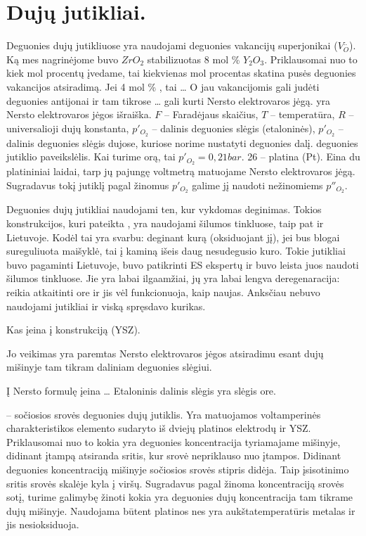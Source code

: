 \section{Dujų jutikliai.}

Deguonies dujų jutikliuose yra naudojami deguonies vakancijų
superjonikai ($V_{O}^{..}$). Ką mes nagrinėjome buvo
$ZrO_{2}$ stabilizuotas 8 mol \% $Y_{2}O_{3}$. Priklausomai nuo
to kiek mol procentų įvedame, tai kiekvienas mol procentas skatina
pusės deguonies vakancijos atsiradimą. Jei 4 mol \% , tai …
O jau vakancijomis gali judėti deguonies antijonai ir tam tikrose
… gali kurti Nersto elektrovaros jėgą.  yra Nersto
elektrovaros jėgos išraiška. $F$ – Faradėjaus skaičius, $T$ – temperatūra,
$R$ – universalioji dujų konstanta, $p'_{O_{2}}$ – dalinis deguonies
slėgis (etaloninės), $p'_{O_{2}}$ – dalinis deguonies slėgis dujose,
kuriose norime nustatyti deguonies dalį.  deguonies jutiklio
paveikslėlis. Kai turime orą, tai $p'_{O_{2}} = 0,21 bar$.
26 – platina (Pt). Eina du platininiai laidai, tarp jų pajungę voltmetrą
matuojame Nersto elektrovaros jėgą. Sugradavus tokį jutiklį pagal žinomus
$p'_{O_{2}}$ galime jį naudoti nežinomiems $p''_{O_2}$.

Deguonies dujų jutikliai naudojami ten, kur vykdomas deginimas. Tokios
konstrukcijos, kuri pateikta , yra naudojami šilumos
tinkluose, taip pat ir Lietuvoje. Kodėl tai yra svarbu: deginant kurą
(oksiduojant jį), jei bus blogai sureguliuota maišyklė, tai į kaminą
išeis daug nesudegusio kuro. Tokie jutikliai buvo pagaminti Lietuvoje,
buvo patikrinti ES ekspertų ir buvo leista juos naudoti šilumos tinkluose.
Jie yra labai ilgaamžiai, jų yra labai lengva deregenaracija: reikia
atkaitinti ore ir jis vėl funkcionuoja, kaip naujas. Anksčiau nebuvo
naudojami jutikliai ir viską spręsdavo kurikas.

\begin{remember}
  \item Kas įeina į konstrukciją (YSZ).
  \item Jo veikimas yra paremtas Nersto elektrovaros jėgos atsiradimu
    esant dujų mišinyje tam tikram daliniam deguonies slėgiui.
  \item Į Nersto formulę įeina …
    Etaloninis dalinis slėgis yra slėgis ore.
\end{remember}

 – sočiosios srovės deguonies dujų jutiklis. Yra
matuojamos voltamperinės charakteristikos elemento sudaryto iš dviejų
platinos elektrodų ir YSZ. Priklausomai nuo to kokia yra deguonies
koncentracija tyriamajame mišinyje, didinant įtampą atsiranda sritis,
kur srovė nepriklauso nuo įtampos. Didinant deguonies koncentraciją
mišinyje sočiosios srovės stipris didėja. Taip įsisotinimo sritis
srovės skalėje kyla į viršų. Sugradavus pagal žinoma
koncentraciją srovės sotį, turime galimybę žinoti kokia yra
deguonies dujų koncentracija tam tikrame dujų mišinyje.
Naudojama būtent platinos nes yra aukštatemperatūris metalas ir
jis nesioksiduoja.

